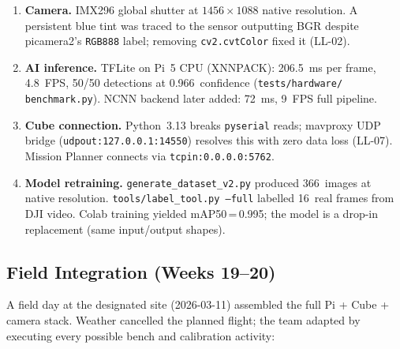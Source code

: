 \begin{enumerate}[leftmargin=1.5em]
  \item \textbf{Camera.}  IMX296 global shutter at
        $1456\times1088$ native resolution.  A persistent blue tint
        was traced to the sensor outputting BGR despite picamera2's
        \texttt{RGB888} label; removing \texttt{cv2.cvtColor} fixed it
        (LL-02).

  \item \textbf{AI inference.}  TFLite on Pi~5 CPU (XNNPACK):
        \SI{206.5}{\milli\second} per frame, 4.8~FPS, 50/50
        detections at 0.966~confidence (\texttt{tests/hardware/%
        benchmark.py}).  NCNN backend later added:
        \SI{72}{\milli\second}, 9~FPS full pipeline.

  \item \textbf{Cube connection.}  Python~3.13 breaks
        \texttt{pyserial} reads; mavproxy UDP bridge
        (\texttt{udpout:127.0.0.1:14550}) resolves this with zero
        data loss (LL-07).  Mission Planner connects via
        \texttt{tcpin:0.0.0.0:5762}.

  \item \textbf{Model retraining.}  \texttt{generate\_dataset\_v2.py}
        produced 366~images at native resolution.
        \texttt{tools/label\_tool.py --full} labelled 16~real frames
        from DJI video.  Colab training yielded mAP50\,=\,0.995;
        the model is a drop-in replacement (same input/output shapes).
\end{enumerate}

\subsection{Field Integration (Weeks 19--20)}\label{sec:field-int}

A field day at the designated site (2026-03-11) assembled the full
Pi + Cube + camera stack.  Weather cancelled the planned flight;
the team adapted by executing every possible bench and calibration
activity:

